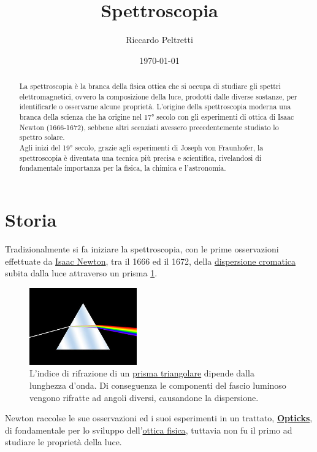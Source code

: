 \documentclass[12pt,a4paper, titlepage, oneside]{article}
\title{Spettroscopia}
\author{Riccardo Peltretti}
\date{\today}
\begin{document}
    \maketitle
    
    \begin{abstract}
        La spettroscopia è la branca della fisica ottica che si occupa di studiare gli spettri elettromagnetici, ovvero la composizione della luce, prodotti dalle diverse sostanze, per identificarle o osservarne alcune proprietà. L'origine della spettroscopia moderna una branca della scienza che ha origine nel 17° secolo con gli esperimenti di ottica di Isaac Newton (1666-1672), sebbene altri scenziati avessero precedentemente studiato lo spettro solare.\\
        Agli inizi del 19° secolo, grazie agli esperimenti di Joseph von Fraunhofer, la spettroscopia è diventata una tecnica più precisa e scientifica, rivelandosi di fondamentale importanza per la fisica, la chimica e l'astronomia. 
    \end{abstract}

    \tableofcontents
    \clearpage

    \section{Storia}
    Tradizionalmente si fa iniziare la spettroscopia, con le prime osservazioni effettuate da \href{https://it.wikipedia.org/wiki/Isaac_Newton}{Isaac Newton}, tra il 1666 ed il 1672, della \href{https://it.wikipedia.org/wiki/Dispersione_ottica}{dispersione cromatica} subita dalla luce attraverso un prisma \ref{fig:dispersione}.
    \begin{figure}[h!]
        \begin{center}
            \includegraphics[width=175px, keepaspectratio]{media/dispersion_prism.jpg}
            \caption{L'indice di rifrazione di un \href{https://it.wikipedia.org/wiki/Prisma_triangolare}{prisma triangolare} dipende dalla lunghezza d'onda. Di conseguenza le componenti del fascio luminoso vengono rifratte ad angoli diversi, causandone la dispersione.}
        \end{center}
        \label{fig:dispersione}
    \end{figure}
    Newton raccolse le sue osservazioni ed i suoi esperimenti in un trattato, \href{https://it.wikipedia.org/wiki/Opticks}{\textbf{Opticks}}, di fondamentale per lo sviluppo dell'\href{https://it.wikipedia.org/wiki/Ottica_fisica}{ottica fisica}, tuttavia non fu il primo ad studiare le proprietà della luce.
\end{document}
